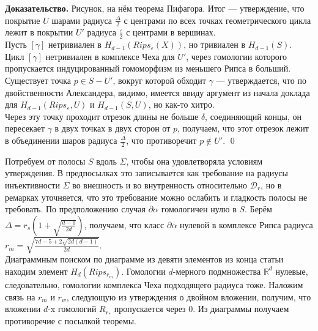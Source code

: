 \documentclass[english,12pt]{article}
\numberwithin{equation}{section}
\theoremstyle{definition}
\theoremstyle{remark}
\newenvironment{pf}{\noindent\textbf{Доказательство.}}{\qed}
\begin{document}
\begin{pf}
  Рисунок, на нём теорема Пифагора. Итог --- утверждение, что покрытие $U$ шарами радиуса $\frac{\Delta}{2}$ с центрами по всех точках геометрического цикла лежит в покрытии $U'$ радиуса $\frac{\varepsilon}{2}$ с центрами в вершинах.\\

  Пусть $[\gamma]$ нетривиален в $H_{d-1}(Rips_{\varepsilon}(X))$, но тривиален в $H_{d-1}(S)$. Цикл $[\gamma]$ нетривиален в комплексе Чеха для $U'$, через гомологии которого пропускается индуцированный гомоморфизм из меньшего Рипса в больший. Существует точка $p \in S - U'$, вокруг которой обходит $\gamma$ --- утверждается, что по двойственности Александера, видимо, имеется ввиду аргумент из начала доклада для $H_{d-1}(Rips_{\varepsilon},U)$ и $H_{d-1}(S,U)$, но как-то хитро.\\

  Через эту точку проходит отрезок длины не больше $\delta$, соединяющий концы, он пересекает $\gamma$ в двух точках в двух сторон от $p$, получаем, что этот отрезок лежит в объединении шаров радиуса $\frac{\Delta}{2}$, что противоречит $p \not\in U'$.
\end{pf}

  Потребуем от полосы $S$ вдоль $\Sigma$, чтобы она удовлетворяла условиям утверждения. В предпосылках это записывается как требование на радиусы инъективности $\Sigma$ во внешность и во внутренность относительно $\mathcal{D}_r$, но в ремарках уточняется, что это требование можно ослабить и гладкость полосы не требовать. По предположению случая $\partial \alpha$ гомологичен нулю в $S$. Берём $\Delta = r_s(1+\sqrt{\frac{d-1}{2d}})$, получаем, что класс $\partial \alpha$ нулевой в комплексе Рипса радиуса $r_m = \sqrt{\frac{7d-5+2\sqrt{2d(d-1)}}{2d}}$.\\

  Диаграммным поиском по диаграмме из девяти элементов из конца статьи находим элемент $H_d(Rips_{r_m})$. Гомологии $d$-мерного подмножества $\mathbb{R}^d$ нулевые, следовательно, гомологии комплекса Чеха подходящего радиуса тоже. Наложим связь на $r_m$ и $r_w$, следующую из утверждения о двойном вложении, получим, что вложении $d$-x гомологий $R_{r_*}$ пропускается через 0. Из диаграммы получаем противоречие с посылкой теоремы.
\end{document}
